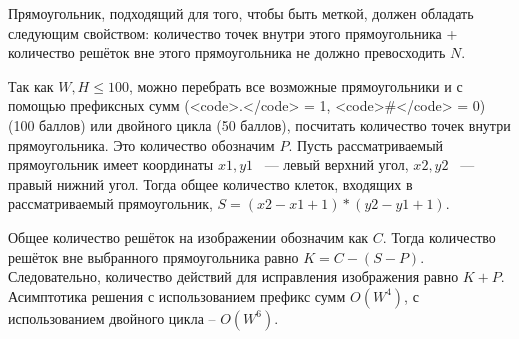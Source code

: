 \solutionSection

Прямоугольник, подходящий для того, чтобы быть меткой, должен обладать следующим свойством: количество точек внутри этого прямоугольника + количество решёток вне этого прямоугольника не должно превосходить $N$.

Так как $W, H \le 100$, можно перебрать все возможные прямоугольники и с помощью префиксных сумм (<code>.</code> = 1, <code>#</code> = 0) (100 баллов)  или двойного цикла (50 баллов), посчитать количество точек внутри прямоугольника. Это количество обозначим $P$. Пусть рассматриваемый прямоугольник имеет координаты $x1, y1$ ~--- левый верхний угол, $x2, y2$ ~--- правый нижний угол. Тогда общее количество клеток, входящих в рассматриваемый прямоугольник, $S = (x2 - x1 + 1) * (y2 - y1 + 1)$.

Общее количество решёток на изображении обозначим как $C$. Тогда количество решёток вне выбранного прямоугольника равно $K = C - (S - P)$. Следовательно, количество действий для исправления изображения равно $K + P$. Асимптотика решения с использованием префикс сумм $O(W^4)$, с использованием двойного цикла -- $O(W^6)$.

\codeExample

